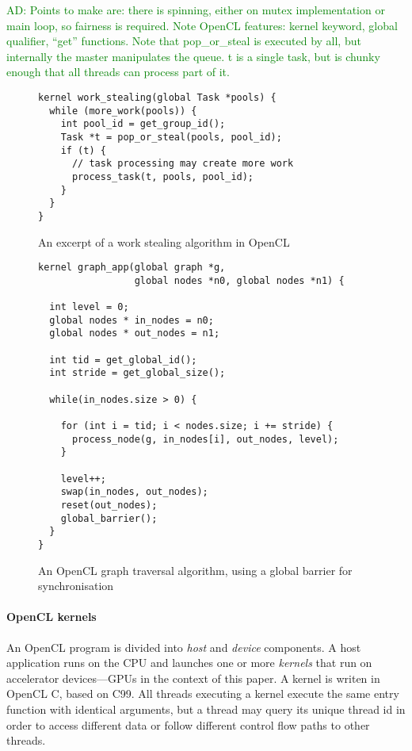 \documentclass[nocopyrightspace,10pt]{sigplanconf}
\newcommand{\ADComment}[1]{\textcolor{green}{AD: #1}}
\begin{document}
\ADComment{Points to make are: there is spinning, either on mutex
implementation or main loop, so fairness is required.  Note OpenCL
features: kernel keyword, global qualifier, ``get'' functions.  Note
that pop\_or\_steal is executed by all, but internally the master
manipulates the queue.  t is a single task, but is chunky enough that
all threads can process part of it.}

\begin{figure}

\begin{lstlisting}
kernel work_stealing(global Task *pools) {
  while (more_work(pools)) {
    int pool_id = get_group_id();
    Task *t = pop_or_steal(pools, pool_id);
    if (t) {
      // task processing may create more work
      process_task(t, pools, pool_id);
    }
  }
}
\end{lstlisting}

\caption{An excerpt of a work stealing algorithm in OpenCL}\label{fig:workstealing}
\end{figure}

\begin{figure}

\begin{lstlisting}
kernel graph_app(global graph *g, 
                 global nodes *n0, global nodes *n1) {

  int level = 0;
  global nodes * in_nodes = n0;
  global nodes * out_nodes = n1;

  int tid = get_global_id();
  int stride = get_global_size();

  while(in_nodes.size > 0) {

    for (int i = tid; i < nodes.size; i += stride) {
      process_node(g, in_nodes[i], out_nodes, level);
    }

    level++;
    swap(in_nodes, out_nodes);
    reset(out_nodes);
    global_barrier();
  }
}
\end{lstlisting}
\caption{An OpenCL graph traversal algorithm, using a global barrier for synchronisation}\label{fig:graphsearch}
\end{figure}

\paragraph{OpenCL kernels}

An OpenCL program is divided into \emph{host} and \emph{device}
components.  A host application runs on the CPU and launches one or
more \emph{kernels} that run on accelerator devices---GPUs in the
context of this paper.  A kernel is writen in OpenCL C, based on C99.
All threads executing a kernel execute the same entry function with
identical arguments, but a thread may query its unique thread id in
order to access different data or follow different control flow paths
to other threads.
\end{document}

